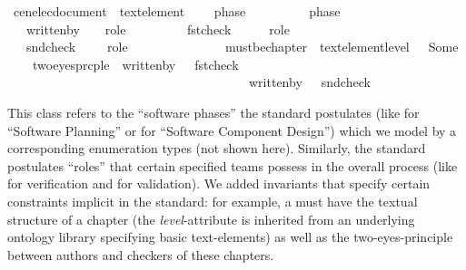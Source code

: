 \begin{isabellebody}
\begin{isamarkuptext}
\begin{isarbox}
\begin{isabelle}
\ cenelec{\isacharunderscore}{\kern0pt}document\ {\isacharequal}{\kern0pt}\ text{\isacharunderscore}{\kern0pt}element\ {\isacharplus}{\kern0pt}\isanewline
\ \ \ phase\ \ \ \ \ \ \ \ \ {\isacharcolon}{\kern0pt}{\isacharcolon}{\kern0pt}\ phase\isanewline
\ \ \ written{\isacharunderscore}{\kern0pt}by\ \ \ {\isacharcolon}{\kern0pt}{\isacharcolon}{\kern0pt}\ role\ \ \ \ \ \ %
\isanewline
\ \ \ fst{\isacharunderscore}{\kern0pt}check\ \ \ \ \ {\isacharcolon}{\kern0pt}{\isacharcolon}{\kern0pt}\ role\ \ \ \ \ \ %
\isanewline
\ \ \ snd{\isacharunderscore}{\kern0pt}check\ \ \ \ {\isacharcolon}{\kern0pt}{\isacharcolon}{\kern0pt}\ role\ \ \ \ \ \ %
\isanewline
\ \ \ \isacommand{{\isachardot}{\kern0pt}{\isachardot}{\kern0pt}}\isacommand{{\isachardot}{\kern0pt}}\ \isanewline
\ \ \ \ must{\isacharunderscore}{\kern0pt}be{\isacharunderscore}{\kern0pt}chapter\ {\isacharcolon}{\kern0pt}{\isacharcolon}{\kern0pt}\ {\isachardoublequoteopen}text{\isacharunderscore}{\kern0pt}element{\isachardot}{\kern0pt}level\ {\isasymsigma}\ {\isacharequal}{\kern0pt}\ Some{\isacharparenleft}{\kern0pt}{}{\isacharparenright}{\kern0pt}{\isachardoublequoteclose}\isanewline
\ \ \ \ two{\isacharunderscore}{\kern0pt}eyes{\isacharunderscore}{\kern0pt}prcple\ {\isacharcolon}{\kern0pt}{\isacharcolon}{\kern0pt}\ {\isachardoublequoteopen}written{\isacharunderscore}{\kern0pt}by\ {\isasymsigma}\ {\isasymnoteq}\ fst{\isacharunderscore}{\kern0pt}check\ {\isasymsigma}\ \isanewline
\ \ \ \ \ \ \ \ \ \ \ \ \ \ \ \ \ \ \ \ \ \ \ \ \ \ \ \ \ \ \ \ \ \ \ \ \ {\isasymand}\ written{\isacharunderscore}{\kern0pt}by\ {\isasymsigma}\ {\isasymnoteq}\ snd{\isacharunderscore}{\kern0pt}check\ {\isasymsigma}{\isachardoublequoteclose}
\end{isabelle}
\end{isarbox}

This class refers to the ``software phases'' the standard postulates (like  for 
``Software Planning'' or  for ``Software Component Design'') 
which we model by a corresponding enumeration types (not shown here).  
Similarly, the standard postulates ``roles'' that certain specified teams possess in the overall process
(like  for verification and  for validation). We added invariants that specify 
certain constraints implicit in the standard: for example, a  must have
the textual structure of a chapter (the \emph{level}-attribute is inherited from an underlying 
ontology library specifying basic text-elements) as well as the two-eyes-principle between authors and
checkers of these chapters.
\end{isamarkuptext}\isamarkuptrue%


\end{isabellebody}

